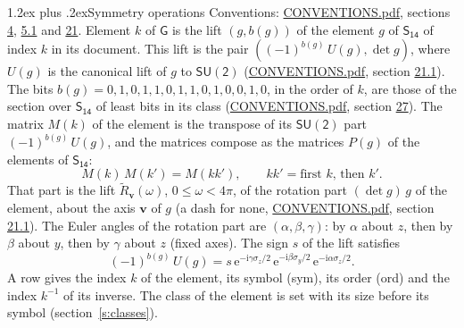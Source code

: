 \documentclass[10pt,a4paper]{article}
\makeatletter
\renewcommand\section{\@startsection{section}{1}{\z@}{-3ex plus -1ex minus -.2ex}%
  {1.2ex plus .2ex}{\normalfont\large\sffamily\bfseries\color{parttitle}}}
\numberwithin{equation}{section}
\newcommand{\grp}[1]{\mathsf{#1}}
\newcommand{\vv}{\mathbf{v}}
\newcommand{\iunit}{\mathrm{i}}
\newcommand{\expe}{\mathrm{e}}
\newcommand{\lift}[1]{\tilde{#1}}
\newcommand{\pauli}[1]{\sigma_{#1}}
\makeatother
\begin{document}
\section{Symmetry operations}\label{s:elements}
Conventions: \href{../../CONVENTIONS.pdf}{CONVENTIONS.pdf}, sections \href{../../../rotation/CONVENTIONS.pdf\#conv.4}{4}, \href{../../../rotation/CONVENTIONS.pdf\#conv.5.1}{5.1} and \href{../../CONVENTIONS.pdf\#conv.21}{21}.
\leavevmode\label{n:index.element}\label{n:element.g}\label{n:function.section}Element $k$ of $\grp{G}$ is the lift $(g, b(g))$ of the element $g$ of \href{../../../rotation/data/pdf/S14.pdf}{$\grp{S_{14}}$} of index $k$ in its document. This lift is the pair $((-1)^{b(g)}\,U(g), \det g)$, where $U(g)$ is the canonical lift of $g$ to $\grp{SU(2)}$ (\href{../../CONVENTIONS.pdf}{CONVENTIONS.pdf}, section \href{../../CONVENTIONS.pdf\#conv.21.1}{21.1}). The bits $b(g) = 0, 1, 0, 1, 1, 0, 1, 1, 0, 1, 0, 0, 1, 0$, in the order of $k$, are those of the section over $\grp{S_{14}}$ of least bits in its class (\href{../../CONVENTIONS.pdf}{CONVENTIONS.pdf}, section \href{../../CONVENTIONS.pdf\#conv.27}{27}). \label{n:matrix.element.pin}\label{n:matrix.element}The matrix $M(k)$ of the element is the transpose of its $\grp{SU(2)}$ part $(-1)^{b(g)}\,U(g)$, and the matrices compose as the matrices $P(g)$ of the elements of $\grp{S_{14}}$:
\begin{equation}\label{e:mprod}M(k)\,M(k') = M(kk'),\qquad kk' = \text{first } k\text{, then } k'.\end{equation}
\leavevmode\label{n:angle.omega}\label{n:vector.axis}\label{n:vector.pole}That part is the lift $\lift{R}_{\vv}(\omega)$, $0 \le \omega < 4\pi$, of the rotation part $(\det g)\,g$ of the element, about the axis $\vv$ of $g$ (a dash for none, \href{../../CONVENTIONS.pdf}{CONVENTIONS.pdf}, section \href{../../CONVENTIONS.pdf\#conv.21.1}{21.1}). \label{n:angle.euler.alpha}\label{n:angle.euler.beta}\label{n:angle.euler.gamma}\label{n:vector.coordinates}The Euler angles of the rotation part are $(\alpha,\beta,\gamma)$: by $\alpha$ about $z$, then by $\beta$ about $y$, then by $\gamma$ about $z$ (fixed axes). \label{n:local.euler.sign}The sign $s$ of the lift satisfies
\begin{equation}\label{e:euler}(-1)^{b(g)}\,U(g) = s\,\expe^{-\iunit\gamma\pauli{z}/2}\,\expe^{-\iunit\beta\pauli{y}/2}\,\expe^{-\iunit\alpha\pauli{z}/2}.\end{equation}
\leavevmode\label{n:index.element.inverse}\label{n:head.sym}\label{n:head.ord}A row gives the index $k$ of the element, its symbol (sym), its order (ord) and the index $k^{-1}$ of its inverse. \label{n:head.class}The class of the element is set with its size before its symbol (section~\ref{s:classes}).
\end{document}
